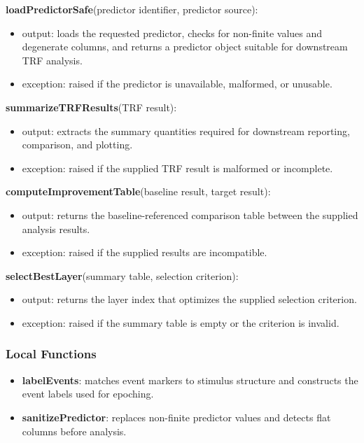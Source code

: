 \documentclass[12pt, titlepage]{article}
\begin{document}
\noindent \textbf{loadPredictorSafe}(predictor identifier, predictor source):
\begin{itemize}
    \item output: loads the requested predictor, checks for non-finite values and degenerate columns, and returns a predictor object suitable for downstream TRF analysis.
    \item exception: raised if the predictor is unavailable, malformed, or unusable.
\end{itemize}

\noindent \textbf{summarizeTRFResults}(TRF result):
\begin{itemize}
    \item output: extracts the summary quantities required for downstream reporting, comparison, and plotting.
    \item exception: raised if the supplied TRF result is malformed or incomplete.
\end{itemize}

\noindent \textbf{computeImprovementTable}(baseline result, target result):
\begin{itemize}
    \item output: returns the baseline-referenced comparison table between the supplied analysis results.
    \item exception: raised if the supplied results are incompatible.
\end{itemize}

\noindent \textbf{selectBestLayer}(summary table, selection criterion):
\begin{itemize}
    \item output: returns the layer index that optimizes the supplied selection criterion.
    \item exception: raised if the summary table is empty or the criterion is invalid.
\end{itemize}

\subsubsection{Local Functions}

\begin{itemize}
    \item \textbf{labelEvents}: matches event markers to stimulus structure and constructs the event labels used for epoching.
    \item \textbf{sanitizePredictor}: replaces non-finite predictor values and detects flat columns before analysis.
\end{itemize}
\end{document}
